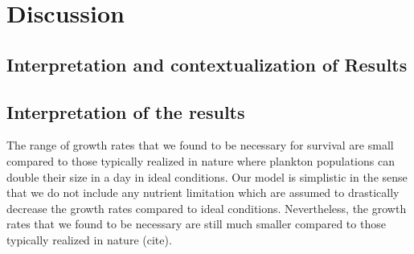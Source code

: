 






\section*{Discussion}

\subsection*{Interpretation and contextualization of Results}

\subsection*{Interpretation of the results}
The range of growth rates that we found to be necessary for survival are small compared to those typically realized in nature where plankton populations can double their size in a day in ideal conditions.
Our model is simplistic in the sense that we do not include any nutrient limitation which are assumed to drastically decrease the growth rates compared to ideal conditions. 
Nevertheless, the growth rates that we found to be necessary are still much smaller compared to those typically realized in nature (cite).

